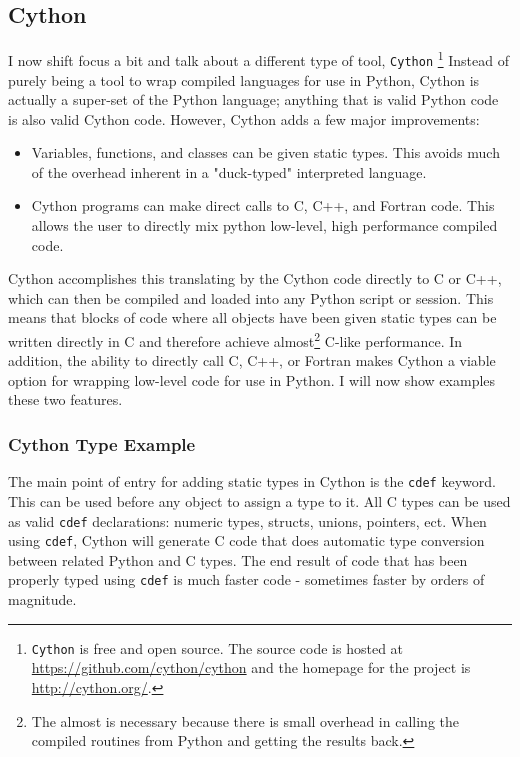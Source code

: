\subsection{Cython} \label{sub:cython}

  I now shift focus a bit and talk about a different type of tool, \texttt{Cython} \footnote{\texttt{Cython} is free and open source. The source code is hosted at \url{https://github.com/cython/cython} and the homepage for the project is \url{http://cython.org/}. } Instead of purely being a tool to wrap compiled languages for use in Python, Cython is actually a super-set of the Python language; anything that is valid Python code is also valid Cython code. However, Cython adds a few major improvements:

  \begin{itemize}
    \item Variables, functions, and classes can be given static types. This avoids much of the overhead inherent in a "duck-typed" interpreted language.
    \item Cython programs can make direct calls to C, C++, and Fortran code. This allows the user to directly mix python low-level, high performance compiled code.
  \end{itemize}

  \mainstretch{}
  Cython accomplishes this translating by the Cython code directly to C or C++, which can then be compiled and loaded into any Python script or session. This means that blocks of code where all objects have been given static types can be written directly in C and therefore achieve almost\footnote{The almost is necessary because there is small overhead in calling the compiled routines from Python and getting the results back.} C-like performance. In addition, the ability to directly call C, C++, or Fortran makes Cython a viable option for wrapping low-level code for use in Python. I will now show examples these two features.


  \subsubsection{Cython Type Example} \label{ssub:cython_type_example}


    The main point of entry for adding static types in Cython is the \texttt{cdef} keyword. This can be used before any object to assign a type to it. All C types can be used as valid \texttt{cdef} declarations: numeric types, structs, unions, pointers, ect. When using \texttt{cdef}, Cython will generate C code that does automatic type conversion between related Python and C types. The end result of code that has been properly typed using \texttt{cdef} is much faster code - sometimes faster by orders of magnitude.

